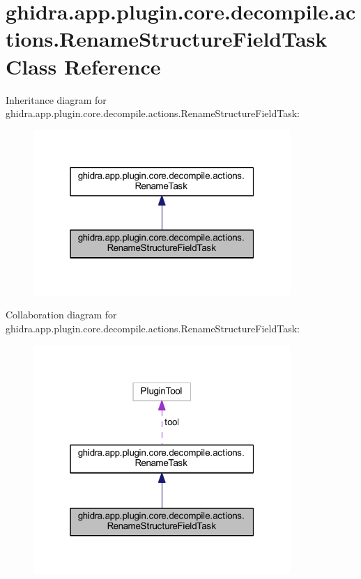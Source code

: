 \hypertarget{classghidra_1_1app_1_1plugin_1_1core_1_1decompile_1_1actions_1_1_rename_structure_field_task}{}\section{ghidra.\+app.\+plugin.\+core.\+decompile.\+actions.\+Rename\+Structure\+Field\+Task Class Reference}
\label{classghidra_1_1app_1_1plugin_1_1core_1_1decompile_1_1actions_1_1_rename_structure_field_task}


Inheritance diagram for ghidra.\+app.\+plugin.\+core.\+decompile.\+actions.\+Rename\+Structure\+Field\+Task\+:
\nopagebreak
\begin{figure}[H]
\begin{center}
\leavevmode
\includegraphics[width=277pt]{classghidra_1_1app_1_1plugin_1_1core_1_1decompile_1_1actions_1_1_rename_structure_field_task__inherit__graph}
\end{center}
\end{figure}


Collaboration diagram for ghidra.\+app.\+plugin.\+core.\+decompile.\+actions.\+Rename\+Structure\+Field\+Task\+:
\nopagebreak
\begin{figure}[H]
\begin{center}
\leavevmode
\includegraphics[width=277pt]{classghidra_1_1app_1_1plugin_1_1core_1_1decompile_1_1actions_1_1_rename_structure_field_task__coll__graph}
\end{center}
\end{figure}
